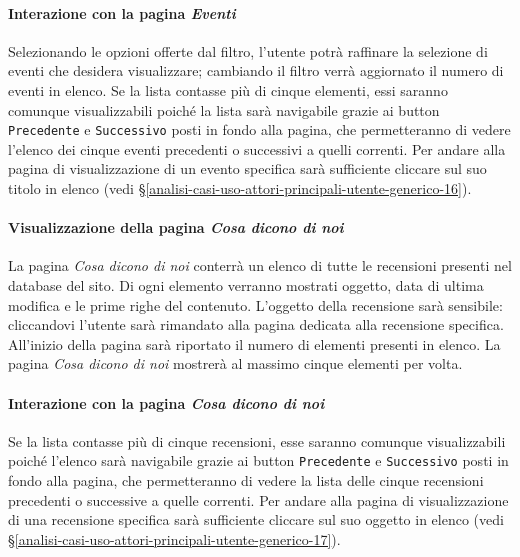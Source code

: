\paragraph{Interazione con la pagina \textit{Eventi}}
\label{analisi-casi-uso-attori-principali-utente-generico-7}
Selezionando le opzioni offerte dal filtro, l'utente potrà raffinare la selezione di eventi che desidera visualizzare; cambiando il filtro verrà aggiornato il numero di eventi in elenco. Se la lista contasse più di cinque elementi, essi saranno comunque visualizzabili poiché la lista sarà navigabile grazie ai button \texttt{Precedente} e \texttt{Successivo} posti in fondo alla pagina, che permetteranno di vedere l'elenco dei cinque eventi precedenti o successivi a quelli correnti. Per andare alla pagina di visualizzazione di un evento specifica sarà sufficiente cliccare sul suo titolo in elenco (vedi §\ref{analisi-casi-uso-attori-principali-utente-generico-16}).

\paragraph{Visualizzazione della pagina \textit{Cosa dicono di noi}}
\label{analisi-casi-uso-attori-principali-utente-generico-8}
La pagina \textit{Cosa dicono di noi} conterrà un elenco di tutte le recensioni presenti nel database del sito. Di ogni elemento verranno mostrati oggetto, data di ultima modifica e le prime righe del contenuto. L'oggetto della recensione sarà sensibile: cliccandovi l'utente sarà rimandato alla pagina dedicata alla recensione specifica. All'inizio della pagina sarà riportato il numero di elementi presenti in elenco. La pagina \textit{Cosa dicono di noi} mostrerà al massimo cinque elementi per volta.

\paragraph{Interazione con la pagina \textit{Cosa dicono di noi}}
\label{analisi-casi-uso-attori-principali-utente-generico-9}
Se la lista contasse più di cinque recensioni, esse saranno comunque visualizzabili poiché l'elenco sarà navigabile grazie ai button \texttt{Precedente} e \texttt{Successivo} posti in fondo alla pagina, che permetteranno di vedere la lista delle cinque recensioni precedenti o successive a quelle correnti. Per andare alla pagina di visualizzazione di una recensione specifica sarà sufficiente cliccare sul suo oggetto in elenco (vedi §\ref{analisi-casi-uso-attori-principali-utente-generico-17}).

